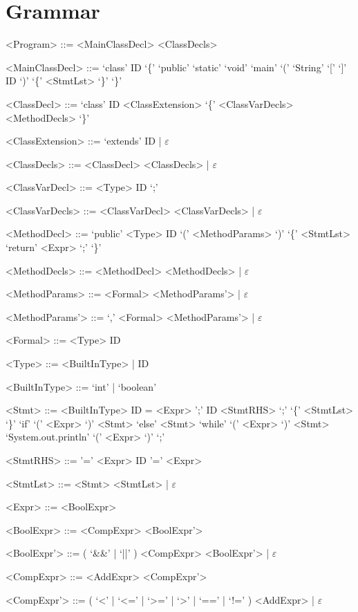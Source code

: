 \documentclass{report}
\begin{document}
\setlength{\grammarparsep}{4pt} %
\setlength{\grammarindent}{12em} %

\section*{Grammar}
\begin{grammar}

<Program> ::= <MainClassDecl> <ClassDecls>

<MainClassDecl> ::= `class' ID `\{' `public' `static' `void' `main' `(' `String' `[' `]' ID `)' `\{' <StmtLst> `\}' `\}'

<ClassDecl> ::= `class' ID <ClassExtension> `\{' <ClassVarDecls> <MethodDecls> `\}'

<ClassExtension> ::= `extends' ID | $\varepsilon$

<ClassDecls> ::= <ClassDecl> <ClassDecls> | $\varepsilon$

<ClassVarDecl> ::= <Type> ID `;'

<ClassVarDecls> ::= <ClassVarDecl> <ClassVarDecls> | $\varepsilon$

<MethodDecl> ::= `public' <Type> ID `(' <MethodParams> `)' `\{' <StmtLst> `return' <Expr> `;' `\}'

<MethodDecls> ::= <MethodDecl> <MethodDecls> | $\varepsilon$

<MethodParams> ::= <Formal> <MethodParams'> | $\varepsilon$

<MethodParams'> ::= `,' <Formal> <MethodParams'> | $\varepsilon$

<Formal> ::= <Type> ID

<Type> ::= <BuiltInType> | ID

<BuiltInType> ::= `int' | `boolean'

<Stmt> ::= <BuiltInType> ID = <Expr> ';'
\alt ID <StmtRHS> `;'
\alt `\{' <StmtLst> `\}'
\alt `if' `(' <Expr> `)' <Stmt> `else' <Stmt>
\alt `while' `(' <Expr> `)' <Stmt>
\alt `System.out.println' `(' <Expr> `)' `;'

<StmtRHS> ::= '=' <Expr>
\alt ID '=' <Expr>

<StmtLst> ::= <Stmt> <StmtLst> | $\varepsilon$

<Expr> ::= <BoolExpr>

<BoolExpr> ::= <CompExpr> <BoolExpr'>

<BoolExpr'> ::= ( `&&' | `||' ) <CompExpr> <BoolExpr'> | $\varepsilon$

<CompExpr> ::= <AddExpr> <CompExpr'>

<CompExpr'> ::= ( `<' | `<=' | `>=' | `>' | `==' | `!=' ) <AddExpr> | $\varepsilon$


\end{grammar}
\end{document}
